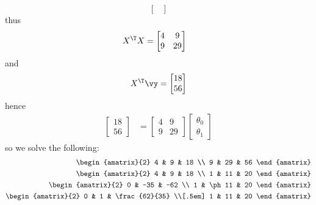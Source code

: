 \documentclass[189]{pset}
\begin{document}
\begin{enumerate}
\[\begin{bmatrix}
        \end{bmatrix}
      \]
      thus
      \begin{align*}
        X^\T X
        &=
          \begin{bmatrix}
            4 & 9 \\
            9 & 29
          \end{bmatrix}
      \end{align*}
      and
      \[
        X^\T \vy =
        \begin{bmatrix}
          18 \\
          56
        \end{bmatrix}
      \]
      hence
      \begin{align*}
        \begin{bmatrix}
          18 \\
          56
        \end{bmatrix}
        &=
          \begin{bmatrix}
            4 & 9 \\
            9 & 29
          \end{bmatrix}
                \begin{bmatrix}
                  \theta_0 \\
                  \theta_1
                \end{bmatrix}
      \end{align*}
      so we solve the following:
      \begin{align*}
        \begin{amatrix}{2}
          4 & 9 & 18 \\
          9 & 29 & 56
        \end{amatrix} \\
        \begin{amatrix}{2}
          4 & 9 & 18 \\
          1 & 11 & 20
        \end{amatrix} \\
        \begin{amatrix}{2}
          0 & -35 & -62 \\
          1 & \ph 11 & 20
        \end{amatrix}\\
        \begin{amatrix}{2}
          0 & 1 & \frac{62}{35} \\[.5em]
          1 & 11 & 20
        \end{amatrix}\\

\end{align*}
\end{enumerate}
\end{document}
